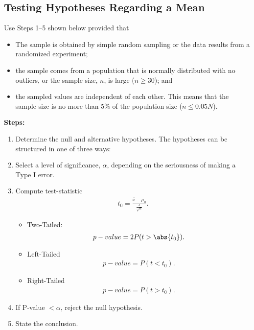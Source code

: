 \documentclass{report}
\begin{document}
    \subsection*{Testing Hypotheses Regarding a Mean}
    \bigbreak \noindent 
        Use Steps 1–5 shown below provided that
    \begin{itemize}
        \item The sample is obtained by simple random sampling or the data results from a randomized experiment;
        \item the sample comes from a population that is normally distributed with no outliers, or the sample size, $n$, is large ($n \geq 30$); and
        \item the sampled values are independent of each other. This means that the sample size is no more than 5\% of the population size ($n \leq 0.05N$).
    \end{itemize}
    \bigbreak \noindent 
    \textbf{Steps:}
    \begin{enumerate}
        \item Determine the null and alternative hypotheses. The hypotheses can be structured in one of three ways:
        \item Select a level of significance, $\alpha$, depending on the seriousness of making a Type I error.
        \item Compute test-statistic
            \begin{align*}
                t_{0} = \frac{\overline{x}-\mu_{0}}{\frac{s}{\sqrt{n}}}
            .\end{align*}
            \begin{itemize}
                \item Two-Tailed: 
                    \begin{align*}
                        p-value = 2P(t > \abs{t_{0}})
                    .\end{align*}
                \item Left-Tailed
                    \begin{align*}
                        p-value = P(t< t_{0})
                    .\end{align*}
                \item Right-Tailed
                    \begin{align*}
                        p-value = P(t>t_{0})
                    .\end{align*}
            \end{itemize}
        \item If P-value $<\alpha$, reject the null hypothesis.
        \item State the conclusion.
    \end{enumerate}
\end{document}
